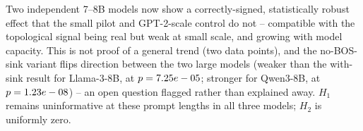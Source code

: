 Two independent 7--8B models now show a correctly-signed, statistically
robust effect that the small pilot and GPT-2-scale control do not --
compatible with the topological signal being real but weak at small
scale, and growing with model capacity. This is not proof of a general
trend (two data points), and the no-BOS-sink variant flips direction
between the two large models (weaker than the with-sink result for
Llama-3-8B, at $p=7.25e-05$; stronger for
Qwen3-8B, at $p=1.23e-08$) -- an open question
flagged rather than explained away. $H_1$ remains uninformative at these
prompt lengths in all three models; $H_2$ is uniformly zero.
